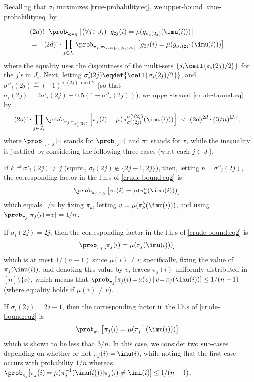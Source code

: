 \Bpf
Recalling that $\sigma_i$ maximizes \eqref{true-probability:eq},
we upper-bound \eqref{true-probability:eq} by

\begin{eqnarray}
\nonumber
\lefteqn{(2d)!\cdot
  \prob_{\ov\pi}\left[(\forall j\!\in\! J_i)\;\;
	    g_{2j}(i)=\mu(g_{\sigma_i(2j)}(\imu(i)))\right]} \\
&=& (2d)!\cdot \prod_{j\in J_i}
     \prob_{\pi_{j},\pi_{\ceil{\sigma_i(2j)/2}}}
          \left[g_{2j}(i)=\mu(g_{\sigma_i(2j)}(\imu(i))) \right]
\label{crude-bound:eq}
\end{eqnarray}
where the equality uses the disjointness of
the multi-sets $\{j,\ceil{\sigma_i(2j)/2}\}$
for the $j$'s in $J_i$.
Next, letting $\sigma'_{i}(2j)\eqdef{\ceil{\sigma_{i}(2j)/2}}$,
and $\sigma''_{i}(2j)\eqdef(-1)^{\sigma_{i}(2j)\bmod2}$
(so that $\sigma_{i}(2j)=2\sigma'_{i}(2j)-0.5(1-\sigma''_{i}(2j))$),
we upper-bound \eqref{crude-bound:eq} by
%
\begin{equation} \label{crude-bound:eq2}
(2d)!\cdot \prod_{j\in J_i}
	\prob_{\pi_{j},\pi_{\sigma'_i(2j)}}\left[
	\pi_{j}(i)=\mu(\pi^{\sigma''_i(2j)}_{\sigma'_i(2j)}(\imu(i)))
           \right]
\;<\; (2d)^{2d}\cdot(3/n)^{|J_i|},
\end{equation}
%
%
%
where $\prob_{\pi_j,\pi_j}[\cdot]$ stands for $\prob_{\pi_j}[\cdot]$
and $\pi^1$ stands for $\pi$,
while the inequality is justified by considering
the following three cases (w.r.t each $j\in J_i$).
\BE
%
%
\item If $k\eqdef\sigma'_i(2j)\neq j$
(equiv., $\sigma_i(2j)\not\in\{2j-1,2j\}$),
then, letting $b=\sigma''_i(2j)$,
the corresponding factor in the l.h.s of \eqref{crude-bound:eq2} is
$$\prob_{\pi_{j},\pi_{k}}\left[\pi_{j}(i) = \mu(\pi^b_k(\imu(i)))\right]$$
which equals $1/n$ by fixing $\pi_k$, letting $v=\mu(\pi^b_k(\imu(i)))$,
and using $\prob_{\pi_j}[\pi_j(i)\!=\!v]=1/n$.
\item If $\sigma_i(2j)=2j$,
then the corresponding factor in the l.h.s of \eqref{crude-bound:eq2} is
$$\prob_{\pi_{j}}\left[\pi_{j}(i) = \mu(\pi_j(\imu(i)))\right]$$
which is at most $1/(n-1)$ since $\mu(i)\neq i$;
specifically, fixing the value of $\pi_j(\imu(i))$,
and denoting this value by $v$,
%
%
leaves $\pi_j(i)$ uniformly distributed in $[n]\setminus\{v\}$,
which means that
$\prob_{\pi_j}[\pi_j(i)\!=\!\mu(v)\,|\,v\!=\!\pi_j(\imu(i))]\leq1/(n-1)$
(where equality holds if $\mu(v)\neq v$).
%
%
%
%
\item If $\sigma_i(2j)=2j-1$,
then the corresponding factor in the l.h.s of \eqref{crude-bound:eq2} is
$$\prob_{\pi_{j}}\left[\pi_{j}(i) = \mu(\pi_j^{-1}(\imu(i)))\right]$$
which is shown to be less than $3/n$.
%
%
In this case, we consider two sub-cases
depending on whether or not $\pi_j(i) = \imu(i)$,
while noting that the first case occurs with probability $1/n$ whereas
$\prob_{\pi_j}[\pi_{j}(i)=\mu(\pi_j^{-1}(\imu(i)))|\pi_j(i)\neq\imu(i)]
 \leq1/(n-1)$.
%
%
%
%
%
%
%
%
%
%
%
%
%
%
\EE

